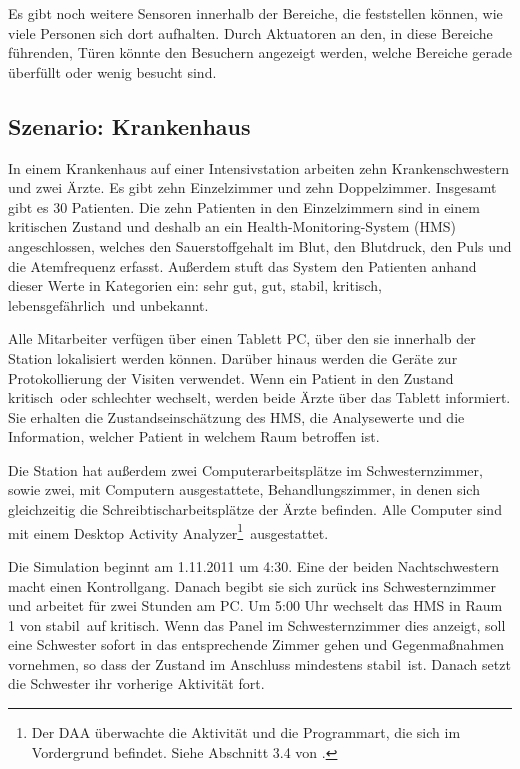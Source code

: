 Es gibt noch weitere Sensoren innerhalb der Bereiche, die feststellen können, wie viele Personen sich dort aufhalten. Durch Aktuatoren an den, in diese Bereiche führenden, Türen könnte den Besuchern angezeigt werden, welche Bereiche gerade überfüllt oder wenig besucht sind.

\subsection*{Szenario: Krankenhaus}

In einem Krankenhaus auf einer Intensivstation arbeiten zehn Krankenschwestern und zwei Ärzte. Es gibt zehn Einzelzimmer und zehn Doppelzimmer. Insgesamt gibt es 30 Patienten. Die zehn Patienten in den Einzelzimmern sind in einem kritischen Zustand und deshalb an ein Health-Monitoring-System (HMS) angeschlossen, welches den Sauerstoffgehalt im Blut, den Blutdruck, den Puls und die Atemfrequenz erfasst. Außerdem stuft das System den Patienten anhand dieser Werte in Kategorien ein: \glqq sehr gut\grqq, \glqq gut\grqq, \glqq stabil\grqq, \glqq kritisch\grqq, \glqq lebensgefährlich\grqq\ und \glqq unbekannt\grqq.

Alle Mitarbeiter verfügen über einen Tablett PC, über den sie innerhalb der Station lokalisiert werden können. Darüber hinaus werden die Geräte zur Protokollierung der Visiten verwendet. Wenn ein Patient in den Zustand \glqq kritisch\grqq\ oder schlechter wechselt, werden beide Ärzte über das Tablett informiert. Sie erhalten die Zustandseinschätzung des HMS, die Analysewerte und die Information, welcher Patient in welchem Raum betroffen ist.

Die Station hat außerdem zwei Computerarbeitsplätze im Schwesternzimmer, sowie zwei, mit Computern ausgestattete, Behandlungszimmer, in denen sich gleichzeitig die Schreibtischarbeitsplätze der Ärzte befinden. Alle Computer sind mit einem \glqq Desktop Activity Analyzer\footnote{Der DAA überwachte die Aktivität und die Programmart, die sich im Vordergrund befindet. Siehe Abschnitt 3.4 von \cite{doku-sensor-aktuator}.}\grqq\ ausgestattet.

Die Simulation beginnt am 1.11.2011 um 4:30. Eine der beiden Nachtschwestern macht einen Kontrollgang. Danach begibt sie sich zurück ins Schwesternzimmer und arbeitet für zwei Stunden am PC. Um 5:00 Uhr wechselt das HMS in Raum 1 von \glqq stabil\grqq\ auf \glqq kritisch\grqq. Wenn das Panel im Schwesternzimmer dies anzeigt, soll eine Schwester sofort in das entsprechende Zimmer gehen und Gegenmaßnahmen vornehmen, so dass der Zustand im Anschluss mindestens \glqq stabil\grqq\ ist. Danach setzt die Schwester ihr vorherige Aktivität fort. 

